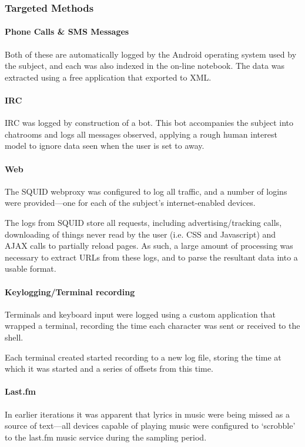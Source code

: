 \subsubsection{Targeted Methods}
\paragraph{Phone Calls \& SMS Messages}
Both of these are automatically logged by the Android operating system used by the subject, and each was also indexed in the on-line notebook.  The data was extracted using a free application that exported to XML.


\paragraph{IRC}
IRC was logged by construction of a bot.  This bot accompanies the subject into chatrooms and logs all messages observed, applying a rough human interest model to ignore data seen when the user is set to away.


\paragraph{Web}
The SQUID webproxy was configured to log all traffic, and a number of logins were provided---one for each of the subject's internet-enabled devices.

The logs from SQUID store all requests, including advertising/tracking calls, downloading of things never read by the user (i.e. CSS and Javascript) and AJAX calls to partially reload pages.  As such, a large amount of processing was necessary to extract URLs from these logs, and to parse the resultant data into a usable format.

\paragraph{Keylogging/Terminal recording}
Terminals and keyboard input were logged using a custom application that wrapped a terminal, recording the time each character was sent or received to the shell.

Each terminal created started recording to a new log file, storing the time at which it was started and a series of offsets from this time.

\paragraph{Last.fm}
In earlier iterations it was apparent that lyrics in music were being missed as a source of text---all devices capable of playing music were configured to `scrobble' to the last.fm music service during the sampling period.

